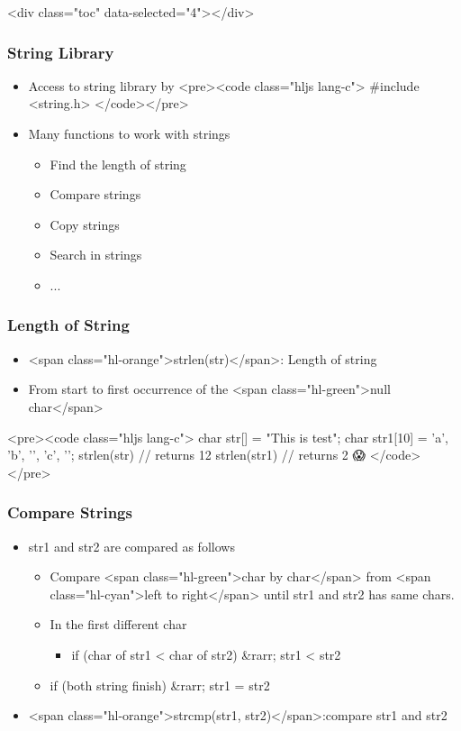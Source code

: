 \documentclass{../c-lecture}
\begin{document}
\begin{frame}
  <div class="toc" data-selected="4"></div>
\end{frame}
\begin{frame}
  \frametitle{String Library}
  \begin{itemize}
    \item Access to string library by
    <pre><code class="hljs lang-c">
#include <string.h>
    </code></pre>
    \item Many functions to work with strings
    \begin{itemize}
      \item Find the length of string
      \item Compare strings
      \item Copy strings
      \item Search in strings
      \item ...
    \end{itemize}
  \end{itemize}
\end{frame}
\begin{frame}
  \frametitle{Length of String}
  \begin{itemize}
    \item <span class="hl-orange">strlen(str)</span>: Length of string
    \item
      From start to first occurrence of the
      <span class="hl-green">null char</span>

  \end{itemize}
  <pre><code class="hljs lang-c">
char str[] = "This is test";
char str1[10] = {'a', 'b', '\0', 'c', '\0'};
strlen(str)  // returns 12
strlen(str1) // returns 2 😱
  </code></pre>
\end{frame}
\begin{frame}
  \frametitle{Compare Strings}
  \begin{itemize}
    \item str1 and str2 are compared as follows
    \begin{itemize}
      \item
        Compare <span class="hl-green">char by char</span> from
        <span class="hl-cyan">left to right</span> until str1 and str2 has same
        chars.

      \item In the first different char
      \begin{itemize}
        \item if (char of str1 < char of str2) &rarr; str1 < str2
      \end{itemize}
      \item if (both string finish) &rarr; str1 = str2
    \end{itemize}
    \item
      <span class="hl-orange">strcmp(str1, str2)</span>:compare str1 and str2

  \end{itemize}
\end{frame}
\end{document}
